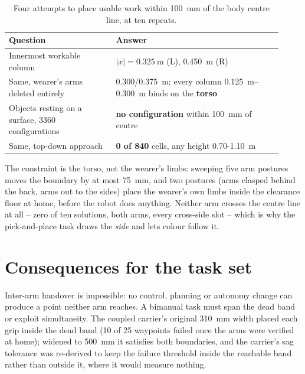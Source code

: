 \begin{table}[htbp]
  \centering
  \small
  \caption[The centre, four measurements]{Four attempts to place usable work
  within \SI{100}{\milli\metre} of the body centre line, at ten repeats.}
  \label{tab:centre}
  \begin{tabular}{@{}p{0.36\linewidth}p{0.56\linewidth}@{}}
    \toprule
    Question & Answer \\
    \midrule
    Innermost workable column & $|x|=\SI{0.325}{\metre}$ (L), \SI{0.450}{\metre} (R) \\
    Same, wearer's arms deleted entirely & \SI{0.300}{}/\SI{0.375}{\metre}; every column
      \SIrange{0.125}{0.300}{\metre} binds on the \textbf{torso} \\
    Objects resting on a surface, \num{3360} configurations & \textbf{no
      configuration} within \SI{100}{\milli\metre} of centre \\
    Same, top-down approach & \textbf{0 of 840} cells, any height \SI{0.70}{}-\SI{1.10}{\metre} \\
    \bottomrule
  \end{tabular}
\end{table}

The constraint is the torso, not the wearer's limbs: sweeping five arm
postures moves the boundary by at most \SI{75}{\milli\metre}, and two
postures (arms clasped behind the back, arms out to the sides) place the
wearer's own limbs inside the clearance floor at home, before the robot
does anything. Neither arm crosses the centre line at all -- zero of ten
solutions, both arms, every cross-side slot -- which is why the
pick-and-place task draws the \emph{side} and lets colour follow it.

\section{Consequences for the task set}

Inter-arm handover is impossible: no control, planning or autonomy change
can produce a point neither arm reaches. A bimanual task must span the dead
band or exploit simultaneity. The coupled carrier's original
\SI{310}{\milli\metre} width placed each grip inside the dead band (10 of 25
waypoints failed once the arms were verified at home); widened to
\SI{500}{\milli\metre} it satisfies both boundaries, and the carrier's sag
tolerance was re-derived to keep the failure threshold inside the reachable
band rather than outside it, where it would measure nothing.

